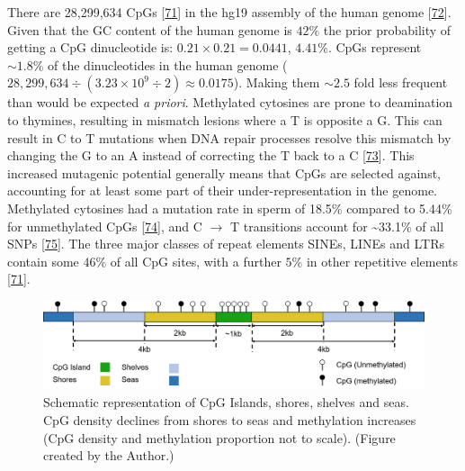 \documentclass[
]{book}
\begin{document}
There are 28,299,634 CpGs {[}\protect\hyperlink{ref-Luo2014}{71}{]} in the hg19 assembly of the human genome {[}\protect\hyperlink{ref-Lander2001}{72}{]}.
Given that the GC content of the human genome is \(42\%\) the prior probability of getting a CpG dinucleotide is: \(0.21 \times 0.21 = 0.0441\), \(4.41\%\).
CpGs represent \(\sim1.8\%\) of the dinucleotides in the human genome ( \(28,299,634 \div (3.23\times10^9\div2) \approx 0.0175\)).
Making them \(\sim2.5\) fold less frequent than would be expected \emph{a priori}.
Methylated cytosines are prone to deamination to thymines, resulting in mismatch lesions where a T is opposite a G.
This can result in C to T mutations when DNA repair processes resolve this mismatch by changing the G to an A instead of correcting the T back to a C {[}\protect\hyperlink{ref-Duncan1980}{73}{]}.
This increased mutagenic potential generally means that CpGs are selected against, accounting for at least some part of their under-representation in the genome.
Methylated cytosines had a mutation rate in sperm of 18.5\% compared to 5.44\% for unmethylated CpGs {[}\protect\hyperlink{ref-Zhou2020}{74}{]}, and C \(\rightarrow\) T transitions account for \textasciitilde33.1\% of all SNPs {[}\protect\hyperlink{ref-Guo2005}{75}{]}.
The three major classes of repeat elements SINEs, LINEs and LTRs contain some \(46\%\) of all CpG sites, with a further \(5\%\) in other repetitive elements {[}\protect\hyperlink{ref-Luo2014}{71}{]}.

\begin{figure}

{\centering \includegraphics[width=0.8\linewidth]{figs/CGI-Shores-Shelves-Seas_2} 

}

\caption{Schematic representation of CpG Islands, shores, shelves and seas. CpG density declines from shores to seas and methylation increases (CpG density and methylation proportion not to scale). (Figure created by the Author.)}\label{fig:CGIs}
\end{figure}
\end{document}
